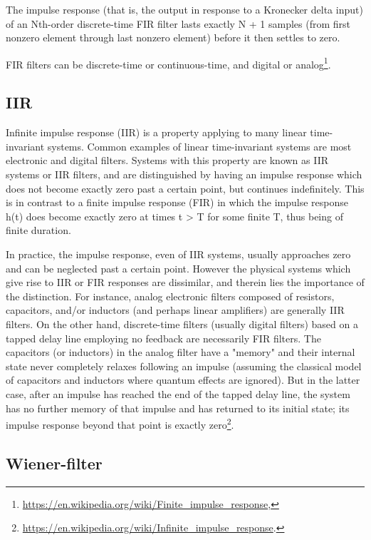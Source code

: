 \documentclass[12pt]{article}
\theoremstyle{plain}
\begin{document}
The impulse response (that is, the output in response to a Kronecker delta input) of an Nth-order discrete-time FIR filter lasts exactly N + 1 samples (from first nonzero element through last nonzero element) before it then settles to zero.

FIR filters can be discrete-time or continuous-time, and digital or analog\footnote{\url{https://en.wikipedia.org/wiki/Finite_impulse_response},}.


\subsection{IIR}

Infinite impulse response (IIR) is a property applying to many linear time-invariant systems. Common examples of linear time-invariant systems are most electronic and digital filters. Systems with this property are known as IIR systems or IIR filters, and are distinguished by having an impulse response which does not become exactly zero past a certain point, but continues indefinitely. This is in contrast to a finite impulse response (FIR) in which the impulse response h(t) does become exactly zero at times t > T for some finite T, thus being of finite duration.

In practice, the impulse response, even of IIR systems, usually approaches zero and can be neglected past a certain point. However the physical systems which give rise to IIR or FIR responses are dissimilar, and therein lies the importance of the distinction. For instance, analog electronic filters composed of resistors, capacitors, and/or inductors (and perhaps linear amplifiers) are generally IIR filters. On the other hand, discrete-time filters (usually digital filters) based on a tapped delay line employing no feedback are necessarily FIR filters. The capacitors (or inductors) in the analog filter have a "memory" and their internal state never completely relaxes following an impulse (assuming the classical model of capacitors and inductors where quantum effects are ignored). But in the latter case, after an impulse has reached the end of the tapped delay line, the system has no further memory of that impulse and has returned to its initial state; its impulse response beyond that point is exactly zero\footnote{\url{https://en.wikipedia.org/wiki/Infinite_impulse_response}.}.


\subsection{Wiener-filter}
\end{document}
